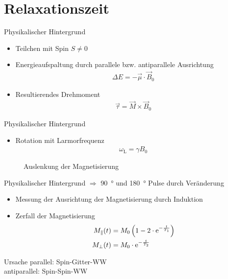 
\thispagestyle{empty}
\frame{\titlepage}


\section{Relaxationszeit}
\begin{frame}{Physikalischer Hintergrund}
	\begin{itemize}
	\item Teilchen mit Spin $S\neq 0$
	\item Energieaufspaltung durch parallele bzw. antiparallele Ausrichtung
		\begin{align*}
		\Delta E = -\vec{\mu}\cdot\vec{B}_0
		\end{align*}
	\item Resultierendes Drehmoment
		\begin{align*}
		\vec{\tau}=\vec{M}\times\vec{B}_0
		\end{align*}
	\end{itemize}
\end{frame}

\begin{frame}{Physikalischer Hintergrund}
	\begin{itemize}
	\item Rotation mit Larmorfrequenz
		\begin{align*}
		\omega_\text{L}=\gamma B_0
		\end{align*}
	\end{itemize}
	\begin{figure}
	
	\caption{Auslenkung der Magnetisierung}
	\end{figure}
\end{frame}

\begin{frame}{Physikalischer Hintergrund}
$\Rightarrow$ \SI{90}{\degree} und \SI{180}{\degree} Pulse durch Veränderung
	\begin{itemize}
	\item Messung der Ausrichtung der Magnetisierung durch Induktion
	\item Zerfall der Magnetisierung
	\begin{align*}
	M_\parallel (t)&=M_0\left(1-2\cdot\mathrm{e}^{-\frac{t}{T_1}}\right)\\
	M_\bot(t)&=M_0\cdot\mathrm{e}^{-\frac{t}{T_2}}
	\end{align*}
	\end{itemize}
	\begin{block}{Ursache}
	parallel: Spin-Gitter-WW\\
	antiparallel: Spin-Spin-WW
	\end{block}
\end{frame}

